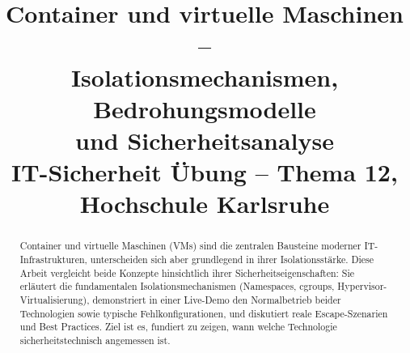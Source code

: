 \documentclass[conference]{IEEEtran}
\begin{document}
\title{Container und virtuelle Maschinen --\\
Isolationsmechanismen, Bedrohungsmodelle\\
und Sicherheitsanalyse\\
{\footnotesize IT-Sicherheit Übung -- Thema 12, Hochschule Karlsruhe}}

\author{%
\and
{}
\and
{}
\and
{}
}

\maketitle

\begin{abstract}
Container und virtuelle Maschinen (VMs) sind die zentralen Bausteine moderner
IT-Infrastrukturen, unterscheiden sich aber grundlegend in ihrer Isolations\-stärke.
Diese Arbeit vergleicht beide Konzepte hinsichtlich ihrer Sicherheits\-eigenschaften:
Sie erläutert die fundamentalen Isolationsmechanismen (Namespaces, cgroups,
Hypervisor-Virtualisierung), demonstriert in einer Live-Demo den Normalbetrieb
beider Technologien sowie typische Fehlkonfigurationen, und diskutiert reale
Escape-Szenarien und Best Practices. Ziel ist es, fundiert zu zeigen, wann welche
Technologie sicherheits\-technisch angemessen ist.
\end{abstract}
\end{document}
